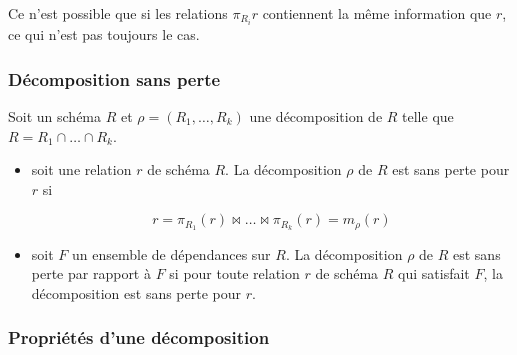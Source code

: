 			Ce n'est possible que si les relations $\pi_{R_i}r$ contiennent la même information que $r$, ce qui n'est pas toujours le cas.
			
			\subsubsection{Décomposition sans perte}
			
			Soit un schéma $R$ et $\rho = (R_1, \dots , R_k)$ une décomposition de $R$ telle que $R = R_1 \cap \dots \cap R_k$.
			
			\begin{itemize}
				\item soit une relation $r$ de schéma $R$. La décomposition $\rho$ de $R$ est sans perte pour $r$ si
				
				$$r = \pi_{R_1}(r) \Join \dots \Join \pi_{R_k}(r) = m_{\rho}(r)$$
				
				\item soit $F$ un ensemble de dépendances sur $R$. La décomposition $\rho$ de $R$ est sans perte par rapport à $F$ si pour toute relation $r$ de schéma $R$ qui satisfait $F$, la décomposition est sans perte pour $r$.
			\end{itemize}
		
		
			\subsubsection{Propriétés d'une décomposition}
			
